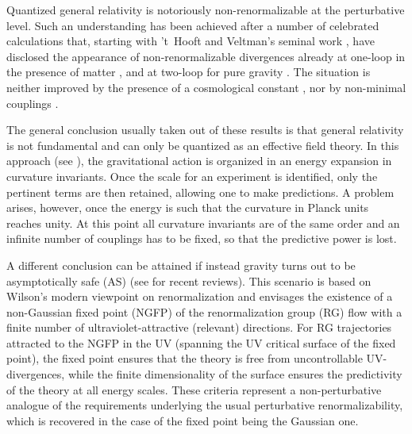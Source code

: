 \documentclass[preprint,preprintnumbers,amsmath,amssymb,nofootinbib,APS]{revtex4}
\newcommand{\2}{\sqrt{2\,}}
\begin{document}
Quantized general relativity is notoriously non-renormalizable at the perturbative level.
Such an understanding has been achieved after a number of celebrated calculations that, 
starting with 't~Hooft and Veltman's seminal work \cite{'tHooft:1974bx}, have disclosed 
the appearance of non-renormalizable divergences already at one-loop in the presence 
of matter  \cite{'tHooft:1974bx,Deser:1974cz-1974zz}, and at two-loop for 
pure gravity \cite{Goroff:1985sz,vandeVen:1991gw}.
The situation is neither improved by the presence of a cosmological constant
 \cite{Christensen:1979iy}, nor by non-minimal 
couplings \cite{Gryzov-Barvinsky,Barvinsky:1993zg}.

The general conclusion usually taken out of these results is that general relativity is not fundamental and can only be quantized as an effective field theory. In this approach (see \cite{Donoghue:1994dn,Burgess:2003jk}), the gravitational action is organized in an energy expansion in curvature invariants. Once the scale for an experiment is identified, only the pertinent terms are then retained, allowing one to make predictions. A problem arises, however, once the energy is such that the curvature in Planck units reaches unity. At this point all curvature invariants are of the same order and an infinite number of couplings has to be fixed, so that the predictive power is lost.

A different conclusion can be attained if instead gravity turns out to be asymptotically safe (AS) \cite{Weinberg:1980gg} (see \cite{Niedermaier:2006wt,Percacci:2007sz,Reuter:2007rv,Litim:2008tt} for recent reviews). This scenario is based on Wilson's modern viewpoint
on renormalization \cite{Wilson:1973jj} and envisages the existence of a non-Gaussian fixed point (NGFP) of the renormalization group (RG) flow with a finite number of ultraviolet-attractive (relevant) directions. For RG trajectories attracted to the NGFP in the UV (spanning the UV critical surface of the fixed point), the fixed point ensures that the theory is free from uncontrollable UV-divergences, while the finite dimensionality of the surface ensures the predictivity of the theory at all energy scales. These criteria represent a non-perturbative analogue of the requirements underlying the usual perturbative renormalizability, which is recovered in the case of the fixed point being the Gaussian one.
\end{document}

